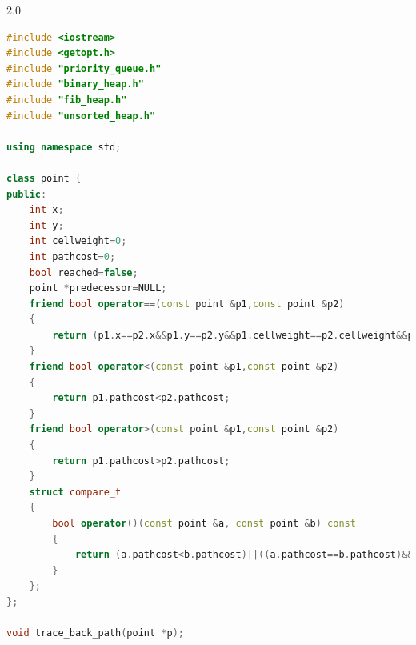\documentclass{article}
\begin{document}
\begin{spacing}{2.0}
\begin{lstlisting}[language=c++]
#include <iostream>
#include <getopt.h>
#include "priority_queue.h"
#include "binary_heap.h"
#include "fib_heap.h"
#include "unsorted_heap.h"

using namespace std;

class point {
public:
    int x;
    int y;
    int cellweight=0;
    int pathcost=0;
    bool reached=false;
    point *predecessor=NULL;
    friend bool operator==(const point &p1,const point &p2)
    {
        return (p1.x==p2.x&&p1.y==p2.y&&p1.cellweight==p2.cellweight&&p1.pathcost==p2.pathcost&&p1.reached==p2.reached&&p1.predecessor==p2.predecessor);
    }
    friend bool operator<(const point &p1,const point &p2)
    {
        return p1.pathcost<p2.pathcost;
    }
    friend bool operator>(const point &p1,const point &p2)
    {
        return p1.pathcost>p2.pathcost;
    }
    struct compare_t
    {
        bool operator()(const point &a, const point &b) const
        {
            return (a.pathcost<b.pathcost)||((a.pathcost==b.pathcost)&&(a.x<b.x))||((a.pathcost==b.pathcost)&&(a.x==b.x)&&(a.y<b.y));
        }
    };
};

void trace_back_path(point *p);


\end{lstlisting}
\end{spacing}
\end{document}
